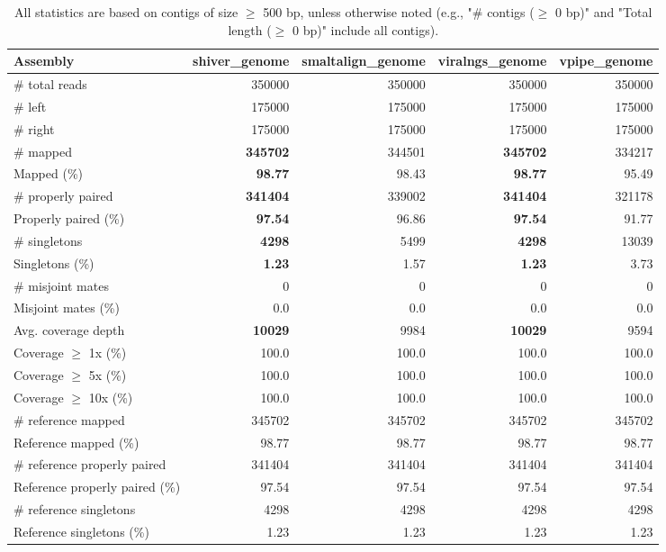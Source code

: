 \documentclass[12pt,a4paper]{article}
\begin{document}
\begin{table}[ht]
\begin{center}
\caption{All statistics are based on contigs of size $\geq$ 500 bp, unless otherwise noted (e.g., "\# contigs ($\geq$ 0 bp)" and "Total length ($\geq$ 0 bp)" include all contigs).}
\begin{tabular}{|l*{4}{|r}|}
\hline
Assembly & shiver\_genome & smaltalign\_genome & viralngs\_genome & vpipe\_genome \\ \hline
\# total reads & 350000 & 350000 & 350000 & 350000 \\ \hline
\# left & 175000 & 175000 & 175000 & 175000 \\ \hline
\# right & 175000 & 175000 & 175000 & 175000 \\ \hline
\# mapped & {\bf 345702} & 344501 & {\bf 345702} & 334217 \\ \hline
Mapped (\%) & {\bf 98.77} & 98.43 & {\bf 98.77} & 95.49 \\ \hline
\# properly paired & {\bf 341404} & 339002 & {\bf 341404} & 321178 \\ \hline
Properly paired (\%) & {\bf 97.54} & 96.86 & {\bf 97.54} & 91.77 \\ \hline
\# singletons & {\bf 4298} & 5499 & {\bf 4298} & 13039 \\ \hline
Singletons (\%) & {\bf 1.23} & 1.57 & {\bf 1.23} & 3.73 \\ \hline
\# misjoint mates & 0 & 0 & 0 & 0 \\ \hline
Misjoint mates (\%) & 0.0 & 0.0 & 0.0 & 0.0 \\ \hline
Avg. coverage depth & {\bf 10029} & 9984 & {\bf 10029} & 9594 \\ \hline
Coverage $\geq$ 1x (\%) & 100.0 & 100.0 & 100.0 & 100.0 \\ \hline
Coverage $\geq$ 5x (\%) & 100.0 & 100.0 & 100.0 & 100.0 \\ \hline
Coverage $\geq$ 10x (\%) & 100.0 & 100.0 & 100.0 & 100.0 \\ \hline
\# reference mapped & 345702 & 345702 & 345702 & 345702 \\ \hline
Reference mapped (\%) & 98.77 & 98.77 & 98.77 & 98.77 \\ \hline
\# reference properly paired & 341404 & 341404 & 341404 & 341404 \\ \hline
Reference properly paired (\%) & 97.54 & 97.54 & 97.54 & 97.54 \\ \hline
\# reference singletons & 4298 & 4298 & 4298 & 4298 \\ \hline
Reference singletons (\%) & 1.23 & 1.23 & 1.23 & 1.23 \\ \hline

\end{tabular}
\end{center}
\end{table}
\end{document}

